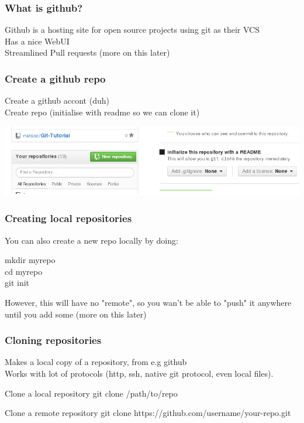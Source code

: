 \documentclass[xcolor=dvipsnames]{beamer}
\begin{document}
\begin{frame}
    \frametitle{What is github?}

    Github is a hosting site for open source projects using git as their VCS\\
    Has a nice WebUI\\
    Streamlined Pull requests (more on this later)\\
\end{frame}

\begin{frame}
    \frametitle{Create a github repo}

    Create a github accont (duh)\\
    Create repo (initialise with readme so we can clone it)
    \begin{center}
        \includegraphics[scale=0.4]{gh-create-repo.png}
    \end{center}

\end{frame}

\begin{frame}
    \frametitle{Creating local repositories}

    You can also create a new repo locally by doing:
    \begin{block}{}
        mkdir myrepo\\
        cd myrepo\\
        git init
    \end{block}
    However, this will have no "remote", so you wan't be able to "push" it anywhere until you add some (more on this later)
\end{frame}

\begin{frame}
    \frametitle{Cloning repositories}
    Makes a local copy of a repository, from e.g github\\
    Works with lot of protocols (http, ssh, native git protocol, even local files).

    \begin{block}{Clone a local repository}
        git clone /path/to/repo
    \end{block}
    \begin{block}{Clone a remote repository}
        git clone https://github.com/username/your-repo.git
    \end{block}
\end{frame}
\end{document}
